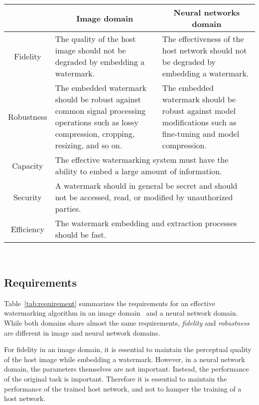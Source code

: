 \documentclass[10pt,twocolumn,letterpaper]{article}
\begin{document}
\begin{table*}[tb]
	\centering
	\caption{Requirements for an effective watermarking algorithm in the image and neural network domains.}
	\label{tab:requirement}
	\begin{tabular}{c||p{18em}|p{18em}} \hline
& \multicolumn{1}{c|}{Image domain}	& \multicolumn{1}{c}{Neural networks domain}	\\ \hline
Fidelity	& The quality of the host image should not be degraded by embedding a watermark.	& The effectiveness of the host network should not be degraded by embedding a watermark.	\\ \hline
Robustness	& The embedded watermark should be robust against common signal processing operations such as lossy compression, cropping, resizing, and so on.	& The embedded watermark should be robust against model modifications such as fine-tuning and model compression.	\\ \hline
Capacity	& \multicolumn{2}{p{36em}}{The effective watermarking system must have the ability to 
embed a large amount of information.}	\\ \hline
Security	& \multicolumn{2}{p{36em}}{A watermark should in general be secret and should not be accessed, read, or modified  by unauthorized parties.}	\\ \hline
Efficiency	& \multicolumn{2}{p{36em}}{The watermark embedding and extraction processes should be fast.}	\\ \hline
	\end{tabular} \\
\end{table*}



\subsection{Requirements}
\label{sec:requirements}
Table~\ref{tab:requirement} summarizes the requirements for an effective watermarking algorithm in an image domain~\cite{Hartung_ieee99, Cox08} and a neural network domain.
While both domains share almost the same requirements, \textit{fidelity} and \textit{robustness} are different in image and neural network domains.

For fidelity in an image domain, it is essential to maintain the perceptual quality of the host image while embedding a watermark.
However, in a neural network domain, the parameters themselves are not important.
Instead, the performance of the original task is important.
Therefore it is essential to maintain the performance of the trained host network, and not to hamper the training of a host network.
\end{document}
